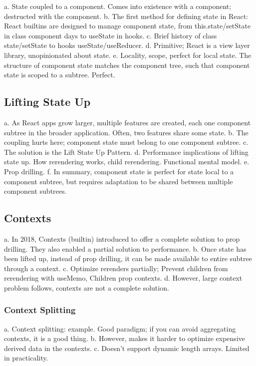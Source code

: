 \documentclass{article}
\begin{document}
a. State coupled to a component. Comes into existence with a component; destructed with the component.
b. The first method for defining state in React: React builtins are designed to manage component state, from this.state/setState in class component days to useState in hooks.
c. Brief history of class state/setState to hooks useState/useReducer.
d. Primitive; React is a view layer library, unopinionated about state.
e. Locality, scope, perfect for local state. The structure of component state matches the component tree, such that component state is scoped to a subtree. Perfect.

\subsection{Lifting State Up}

a. As React apps grow larger, multiple features are created, each one component subtree in the broader application. Often, two features share some state.
b. The coupling hurts here; component state must belong to one component subtree.
c. The solution is the Lift State Up Pattern. 
d. Performance implications of lifting state up. How rerendering works, child rerendering. Functional mental model.
e. Prop drilling.
f. In summary, component state is perfect for state local to a component subtree, but requires adaptation to be shared between multiple component subtrees.

\subsection{Contexts}

a. In 2018, Contexts (builtin) introduced to offer a complete solution to prop drilling. They also enabled a partial solution to performance.
b. Once state has been lifted up, instead of prop drilling, it can be made available to entire subtree through a context.
c. Optimize rerenders partially; Prevent children from rerendering with useMemo, Children prop contexts.
d. However, large context problem follows, contexts are not a complete solution.

\subsubsection{Context Splitting}

a. Context splitting: example. Good paradigm; if you can avoid aggregating  contexts, it is a good thing.
b. However, makes it harder to optimize expensive derived data in the contexts.
c. Doesn't support dynamic length arrays. Limited in practicality.
\end{document}
